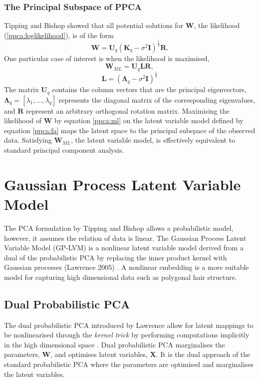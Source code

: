 \documentclass[ %
author={Dillon Keith Diep},
supervisor={Dr. Carl Henrik Ek},
degree={MEng},
title={ART-CG Hair:},
subtitle={Assisted Real-time Content Generation of Stylised Virtual Hair},
type={Research},
year={2017} ]{dissertation}
\begin{document}
\subsubsection{The Principal Subspace of PPCA}
Tipping and Bishop showed that all potential solutions for $\bm{W}$, the likelihood (\ref{ppca:loglikelihood}), is of the form \cite{ppca} $$\bm{W}=\bm{U}_q(\bm{K}_q-\sigma^2\bm{I})^\frac{1}{2}\bm{R}.$$
One particular case of interest is when the likelihood is maximised,
\begin{equation} \label{ppca:ml}
\bm{W}_{ML}=\bm{U}_q\bm{LR},
\end{equation}
$$\bm{L}=(\bm{\Lambda}_q-\sigma^2\bm{I})^{\frac{1}{2}}$$
The matrix $\bm{U}_q$ contains the column vectors that are the principal eigenvectors, $\bm{\Lambda}_q=[\lambda_1,...,\lambda_q]$ represents the diagonal matrix of the corresponding eigenvalues, and $\bm{R}$ represent an arbitrary orthogonal rotation matrix. 
Maximising the likelihood of $\bm{W}$ by equation \ref{ppca:ml} on the latent variable model defined by equation \ref{ppca:fa} maps the latent space to the principal subspace of the observed data. Satisfying $\bm{W}_{ML}$, the latent variable model, is effectively equivalent to standard principal component analysis.

\section{Gaussian Process Latent Variable Model}
The PCA formulation by Tipping and Bishop allows a probabilistic model, however, it assumes the relation of data is linear. The Gaussian Process Latent Variable Model (GP-LVM) is a nonlinear latent variable model derived from a dual of the probabilistic PCA by replacing the inner product kernel with Gaussian processes (Lawrence 2005) \cite{gplvm}. A nonlinear embedding is a more suitable model for capturing high dimensional data such as polygonal hair structure.

\subsection{Dual Probabilistic PCA}
The dual probabilistic PCA introduced by Lawrence allow for latent mappings to be nonlinearised through the \textit{kernel trick} by performing computations implicitly in the high dimensional space \cite[p.8]{gp}. Dual probabilistic PCA marginalises the parameters, $\bm{W}$, and optimises latent variables, $\bm{X}$. It is the dual approach of the standard probabilistic PCA where the parameters are optimised and marginalises the latent variables.
\end{document}
